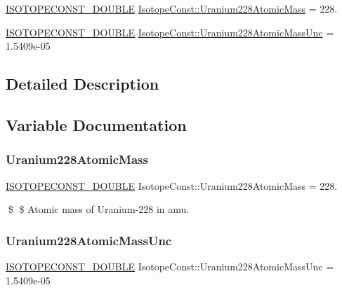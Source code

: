 \begin{DoxyCompactItemize}
\item 
\mbox{\hyperlink{group___isotope_const-_macros_ga8f45a7272ce02c0b4c65c44636ed719a}{I\+S\+O\+T\+O\+P\+E\+C\+O\+N\+S\+T\+\_\+\+D\+O\+U\+B\+LE}} \mbox{\hyperlink{group___isotope_const-_uranium-_u228_ga014277b00282f7afc4a2a20cc8d73799}{Isotope\+Const\+::\+Uranium228\+Atomic\+Mass}} = 228.
\item 
\mbox{\hyperlink{group___isotope_const-_macros_ga8f45a7272ce02c0b4c65c44636ed719a}{I\+S\+O\+T\+O\+P\+E\+C\+O\+N\+S\+T\+\_\+\+D\+O\+U\+B\+LE}} \mbox{\hyperlink{group___isotope_const-_uranium-_u228_ga6e373b9b77cd46507c9bfebc5638b2ac}{Isotope\+Const\+::\+Uranium228\+Atomic\+Mass\+Unc}} = 1.\+5409e-\/05
\end{DoxyCompactItemize}


\subsection{Detailed Description}


\subsection{Variable Documentation}
\mbox{\label{group___isotope_const-_uranium-_u228_ga014277b00282f7afc4a2a20cc8d73799}} 
\subsubsection{\texorpdfstring{Uranium228\+Atomic\+Mass}{Uranium228AtomicMass}}
{\footnotesize\ttfamily \mbox{\hyperlink{group___isotope_const-_macros_ga8f45a7272ce02c0b4c65c44636ed719a}{I\+S\+O\+T\+O\+P\+E\+C\+O\+N\+S\+T\+\_\+\+D\+O\+U\+B\+LE}} Isotope\+Const\+::\+Uranium228\+Atomic\+Mass = 228.}

\$ \$ Atomic mass of Uranium-\/228 in amu. \mbox{\label{group___isotope_const-_uranium-_u228_ga6e373b9b77cd46507c9bfebc5638b2ac}} 
\subsubsection{\texorpdfstring{Uranium228\+Atomic\+Mass\+Unc}{Uranium228AtomicMassUnc}}
{\footnotesize\ttfamily \mbox{\hyperlink{group___isotope_const-_macros_ga8f45a7272ce02c0b4c65c44636ed719a}{I\+S\+O\+T\+O\+P\+E\+C\+O\+N\+S\+T\+\_\+\+D\+O\+U\+B\+LE}} Isotope\+Const\+::\+Uranium228\+Atomic\+Mass\+Unc = 1.\+5409e-\/05}

